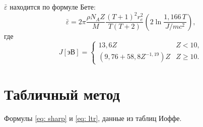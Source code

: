 \documentclass[a4paper,12pt]{article} %
\newcommand{\eps}{\varepsilon}
\begin{document}
$\bar{\eps}$ находится по формуле Бете:
\begin{equation}
	\bar{\eps} = 
	2 \pi \frac{\rho N_AZ}{M} 
	\frac{(T+1)^2 r_e^2}{T(T+2)}
	\left(
		2 \ln
		\frac{1{,}166\,T}{J/mc^2}
	\right),
\end{equation}
где 
\begin{equation}
	J [\text{эВ}] = 
	\begin{cases}
		13{,}6 Z & Z<10, \\
		(9{,}76 + 58{,}8 Z^{-1{,}19}) Z & Z\geqslant 10.
	\end{cases}
\end{equation}

\section{Табличный метод}

Формулы \eqref{eq: sharp} и \eqref{eq: ltr}, данные из таблиц Иоффе.
\end{document}
